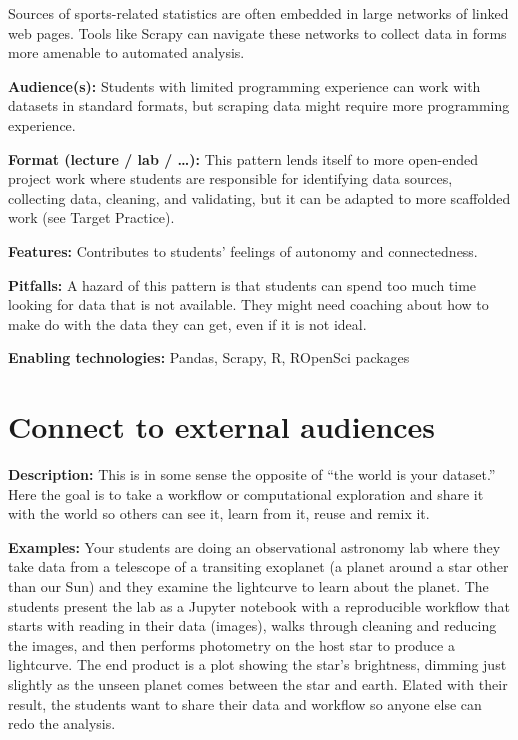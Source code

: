 \documentclass[]{book}
\begin{document}
Sources of sports-related statistics are often embedded in large
networks of linked web pages. Tools like Scrapy can navigate these
networks to collect data in forms more amenable to automated analysis.

\textbf{Audience(s):} Students with limited programming experience can
work with datasets in standard formats, but scraping data might require
more programming experience.

\textbf{Format (lecture / lab / \ldots{}):} This pattern lends itself to
more open-ended project work where students are responsible for
identifying data sources, collecting data, cleaning, and validating, but
it can be adapted to more scaffolded work (see Target Practice).

\textbf{Features:} Contributes to students' feelings of autonomy and
connectedness.

\textbf{Pitfalls:} A hazard of this pattern is that students can spend
too much time looking for data that is not available. They might need
coaching about how to make do with the data they can get, even if it is
not ideal.

\textbf{Enabling technologies:} Pandas, Scrapy, R, ROpenSci packages

\section{Connect to external
audiences}\label{connect-to-external-audiences}

\textbf{Description:} This is in some sense the opposite of ``the world
is your dataset.'' Here the goal is to take a workflow or computational
exploration and share it with the world so others can see it, learn from
it, reuse and remix it.

\textbf{Examples:} Your students are doing an observational astronomy
lab where they take data from a telescope of a transiting exoplanet (a
planet around a star other than our Sun) and they examine the lightcurve
to learn about the planet. The students present the lab as a Jupyter
notebook with a reproducible workflow that starts with reading in their
data (images), walks through cleaning and reducing the images, and then
performs photometry on the host star to produce a lightcurve. The end
product is a plot showing the star's brightness, dimming just slightly
as the unseen planet comes between the star and earth. Elated with their
result, the students want to share their data and workflow so anyone
else can redo the analysis.
\end{document}

